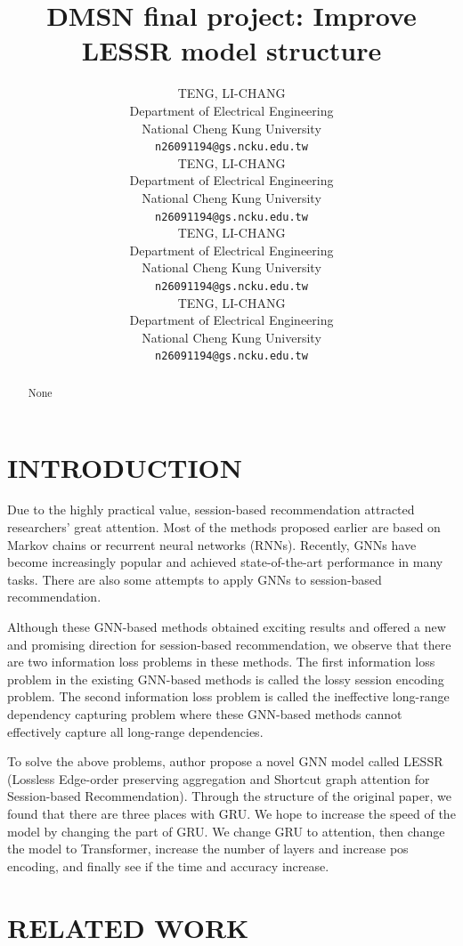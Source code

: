 \documentclass{article}
\title{DMSN final project: Improve LESSR model structure}
\author{%
  TENG, LI-CHANG\\
  Department of Electrical Engineering\\
  National Cheng Kung University\\
  \texttt{n26091194@gs.ncku.edu.tw} \\
  \And
  TENG, LI-CHANG\\
  Department of Electrical Engineering\\
  National Cheng Kung University\\
  \texttt{n26091194@gs.ncku.edu.tw} \\
  \AND
  TENG, LI-CHANG\\
  Department of Electrical Engineering\\
  National Cheng Kung University\\
  \texttt{n26091194@gs.ncku.edu.tw} \\
  \And
  TENG, LI-CHANG\\
  Department of Electrical Engineering\\
  National Cheng Kung University\\
  \texttt{n26091194@gs.ncku.edu.tw} \\
}
\begin{document}
\maketitle


\begin{abstract}
    None
    \vspace{2cm}
\end{abstract}


\section{INTRODUCTION}

Due to the highly practical value,
session-based recommendation attracted researchers’ great attention.
Most of the methods proposed earlier are based on Markov chains or
recurrent neural networks (RNNs). Recently, GNNs have become increasingly
popular and achieved state-of-the-art performance in many tasks.
There are also some attempts to apply GNNs to session-based recommendation.

Although these GNN-based methods obtained exciting results and
offered a new and promising direction for session-based recommendation,
we observe that there are two information loss problems in these methods.
The first information loss problem in the existing GNN-based methods
is called the lossy session encoding problem.
The second information loss problem is called the
ineffective long-range dependency capturing problem where
these GNN-based methods cannot effectively capture all long-range dependencies.

To solve the above problems, author propose a novel GNN model called
LESSR (Lossless Edge-order preserving aggregation
and Shortcut graph attention for Session-based Recommendation).
Through the structure of the original paper,
we found that there are three places with GRU.
We hope to increase the speed of the model by changing the part of GRU.
We change GRU to attention,
then change the model to Transformer,
increase the number of layers and increase pos encoding,
and finally see if the time and accuracy increase.



\section{RELATED WORK}
\end{document}
